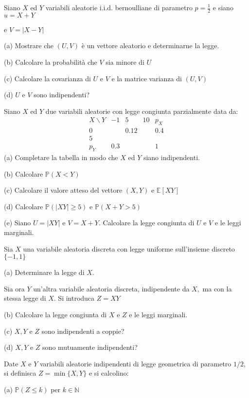 Siano $X$ ed $Y$ variabili aleatorie i.i.d. bernoulliane di parametro $p=\frac{1}{2}$ e siano $u=X+Y$

e $V=|X-Y|$

(a) Mostrare che $(U,V)$ è un vettore aleatorio e determinarne la legge.

(b) Calcolare la probabilità che $V$ sia minore di $U$

(c) Calcolare la covarianza di $U$ e $V$ e la matrice varianza di $(U,V)$

(d) $U$ e $V$ sono indipendenti?
\Esercizio{}

Siano $X$ ed $Y$ due variabili aleatorie con legge congiunta parzialmente data da:
\begin{equation*}
\begin{array}{ c|c|c|c|c }
X\backslash Y & -1 & 5 & 10 & p_{X}\\
\hline
0 &  & 0.12 &  & 0.4\\
\hline
5 &  &  &  & \\
\hline
p_{Y} & 0.3 &  &  & 1
\end{array}
\end{equation*}
(a) Completare la tabella in modo che $X$ ed $Y$ siano indipendenti.

(b) Calcolare $\mathbb{P} (X< Y)$

(c) Calcolare il valore atteso del vettore $(X,Y)$ e $\mathbb{E} [XY]$

(d) Calcolare $\mathbb{P} (|XY|\geq 5)$ e $\mathbb{P} (X+Y >5)$

(e) Siano $U=|XY|$ e $V=X+Y$. Calcolare la legge congiunta di $U$ e $V$ e le leggi marginali.
\Esercizio{}

Sia $X$ una variabile aleatoria discreta con legge uniforme sull'insieme discreto $\{-1,1\}$

(a) Determinare la legge di $X$.

Sia ora $Y$ un'altra variabile aleatoria discreta, indipendente da $X,$ ma con la stessa legge di $X$. Si introduca $Z=XY$

(b) Calcolare la legge congiunta di $X$ e $Z$ e le leggi marginali.

(c) $X,Y$ e $Z$ sono indipendenti a coppie?

(d) $X,Y$ e $Z$ sono mutuamente indipendenti?
\Esercizio{}

Date $X$ e $Y$ variabili aleatorie indipendenti di legge geometrica di parametro $1/2$, si definisca $Z=\min \{X,Y\}$ e si calcolino:

(a) $\mathbb{P} (Z\leq k)$ per $k\in \mathbb{N}$

